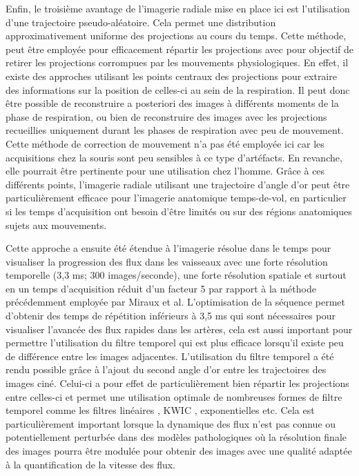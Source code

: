Enfin, le troisième avantage de l’imagerie radiale mise en place ici est l’utilisation d’une trajectoire pseudo-aléatoire. Cela permet une distribution approximativement uniforme des projections au cours du temps. Cette méthode, peut être employée pour efficacement répartir les projections avec pour objectif de retirer les projections corrompues par les mouvements physiologiques. En effet, il existe des approches utilisant les points centraux des projections pour extraire des informations sur la position de celles-ci au sein de la respiration. Il peut donc être possible de reconstruire a posteriori des images à différents moments de la phase de respiration, ou bien de reconstruire des images avec les projections recueillies uniquement durant les phases de respiration avec peu de mouvement. Cette méthode de correction de mouvement n’a pas été employée ici car les acquisitions chez la souris sont peu sensibles à ce type d’artéfacts. En revanche, elle pourrait être pertinente pour une utilisation chez l’homme. Grâce à ces différents points, l’imagerie radiale utilisant une trajectoire d’angle d’or peut être particulièrement efficace pour l’imagerie anatomique temps-de-vol, en particulier si les temps d’acquisition ont besoin d’être limités ou sur des régions anatomiques sujets aux mouvements.
 

Cette approche a ensuite été étendue à l'imagerie résolue dans le temps pour visualiser la progression des flux dans les vaisseaux avec une forte résolution temporelle (3,3 ms; 300 images/seconde), une forte résolution spatiale et surtout en un temps d'acquisition réduit d'un facteur 5 par rapport à la méthode précédemment employée par Miraux et al.
L'optimisation de la séquence permet d'obtenir des temps de répétition inférieurs à 3,5 ms qui sont nécessaires pour visualiser l'avancée des flux rapides dans les artères, cela est aussi important pour permettre l'utilisation du filtre temporel qui est plus efficace lorsqu'il existe peu de différence entre les images adjacentes.
L'utilisation du filtre temporel a été rendu possible grâce à l'ajout du second angle d'or entre les trajectoires des images ciné. Celui-ci a pour effet de particulièrement bien répartir les projections entre celles-ci et permet une utilisation optimale de nombreuses formes de filtre temporel comme les filtres linéaires \cite{Barger:2002fk}, KWIC \cite{Song2004Dynamic-MRI-wit}, exponentielles etc. Cela est particulièrement important lorsque la dynamique des flux n'est pas connue ou potentiellement perturbée dans des modèles pathologiques où la résolution finale des images pourra être modulée pour obtenir des images avec une qualité adaptée à la quantification de la vitesse des flux.

